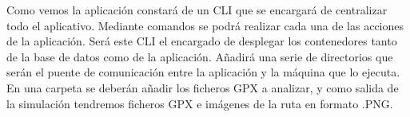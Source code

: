Como vemos la aplicación constará de un \ac{CLI} que se encargará de centralizar todo el aplicativo. Mediante comandos
se podrá realizar cada una de las acciones de la aplicación. Será este 	\ac{CLI} el encargado de desplegar los contenedores 
tanto de la base de datos como de la aplicación. Añadirá una serie de directorios que serán el puente de comunicación entre
la aplicación y la máquina que lo ejecuta. En una carpeta se deberán añadir los ficheros \ac{GPX} a analizar, y como salida 
de la simulación tendremos ficheros \ac{GPX} e imágenes de la ruta en formato .PNG.


